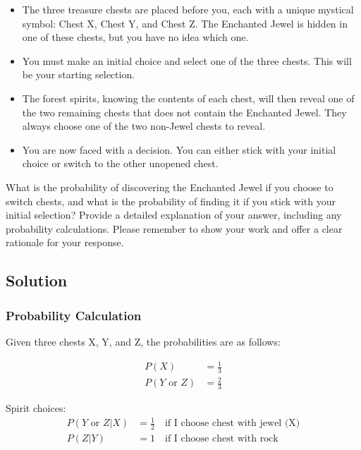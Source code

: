 \documentclass[a4paper, 10pt]{article}
\begin{document}
            \begin{itemize}
                \item The three treasure chests are placed before you, each with a unique mystical symbol: Chest X, Chest Y, and Chest Z. The Enchanted Jewel is hidden in one of these chests, but you have no idea which one.
                \item You must make an initial choice and select one of the three chests. This will be your starting selection.
                \item The forest spirits, knowing the contents of each chest, will then reveal one of the two remaining chests that does not contain the Enchanted Jewel. They always choose one of the two non-Jewel chests to reveal.
                \item You are now faced with a decision. You can either stick with your initial choice or switch to the other unopened chest.
            \end{itemize}

            What is the probability of discovering the Enchanted Jewel if you choose to switch chests, and what is the probability of finding it if you stick with your initial selection? Provide a detailed explanation of your answer, including any probability calculations. Please remember to show your work and offer a clear rationale for your response.

        \subsection{Solution}
            \subsubsection{Probability Calculation}
                Given three chests X, Y, and Z, the probabilities are as follows:

                \begin{align*}
                    P(X) &= \frac{1}{3} \\
                    P(Y \text{ or } Z) &= \frac{2}{3}
                \end{align*}

                \noindent Spirit choices:
                \begin{align*}
                    P(Y \text{ or } Z | X) &= \frac{1}{2} \quad \text{if I choose chest with jewel (X)} \\
                    P(Z | Y) &= 1 \quad \text{if I choose chest with rock}
                \end{align*}
\end{document}
